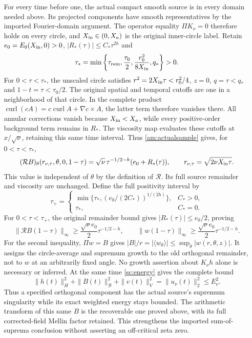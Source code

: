 For every time before one, the actual compact smooth source is in
every domain needed above. Its projected components have smooth
representatives by the imported Fourier-domain argument. The
operator equality $\Pi K_\nu=0$ therefore holds on every circle,
and $X_{\rm in}\in(0,X_a)$ is the original inner-circle label. Retain
$e_0=E_0(X_{\rm in},0)>0$, $|R_*(\tau)|\leq C_*\tau^{2h}$ and
\[
 \tau_* = \min\left\{\tau_{\rm rem},\frac{\tau_0}{2},
                     \frac{r_0^2}{8X_{\rm in}},q_*\right\}>0.
\]
For $0<\tau<\tau_*$, the unscaled circle satisfies
$r^2=2X_{\rm in}\tau<r_0^2/4$, $z=0$, $q=\tau<q_*$ and
$1-t=\tau<\tau_0/2$. The original spatial and temporal cutoffs
are one in a neighborhood of that circle. In the complete product
$\operatorname{curl}(cA)=c\operatorname{curl}A+\nabla c\times A$,
the latter term therefore vanishes there. All annular corrections
vanish because $X_{\rm in}<X_a$, while every positive-order
background term remains in $R_*$. The viscosity map evaluates
these cutoffs at $x/\sqrt\nu$, retaining this same time interval.
Thus \eqref{am:actualsample} gives, for $0<\tau<\tau_*$,
\[
 (\mathcal RB)_\theta
       (r_{\nu,\tau},\theta,0,1-\tau)
   =\sqrt\nu\,\tau^{-1/2-h}(e_0+R_*(\tau)),
 \qquad r_{\nu,\tau}=\sqrt{2\nu X_{\rm in}\tau}.
\]
This value is independent of $\theta$ by the definition of
$\mathcal R$. Its full source remainder and viscosity are unchanged.
Define the full positivity interval by
\[
 \tau_+=\begin{cases}
 \min\{\tau_*,(e_0/(2C_*))^{1/(2h)}\},&C_*>0,\\
 \tau_*,&C_*=0.
 \end{cases}
\]
For $0<\tau<\tau_+$, the original remainder bound gives
$|R_*(\tau)|\leq e_0/2$, proving
\begin{equation}
 \|\mathcal RB(1-\tau)\|_\infty
       \geq\frac{\sqrt\nu e_0}{2}\tau^{-1/2-h},
 \qquad
 \|w(1-\tau)\|_\infty
       \geq\frac{\sqrt\nu e_0}{2}\tau^{-1/2-h}.
 \label{sc:componentgrowth}
\end{equation}
For the second inequality, $\Pi w=B$ gives
$|B|/r=|\langle w_\theta\rangle|
             \leq\sup_\theta|w(r,\theta,z)|$.
It assigns the circle-average and supremum growth to the old
orthogonal remainder, not to $w$ at an arbitrarily fixed angle.
No growth assertion about $K_\nu h$ alone is necessary or inferred.
At the same time \eqref{sc:energy} gives the complete bound
\[
 \|h(t)\|_H^2+\|B(t)\|_{\mathcal B}^2+\|v(t)\|_V^2
        =\|u_\nu(t)\|_2^2\leq E_\nu^2.
\]
Thus a specified orthogonal component has the actual source's
supremum singularity while its exact weighted energy stays bounded.
The arithmetic transform of this same $B$ is the recoverable one
proved above, with its full corrected-field Mellin factor retained.
This strengthens the imported sum-of-suprema conclusion without
asserting an off-critical zeta zero.

